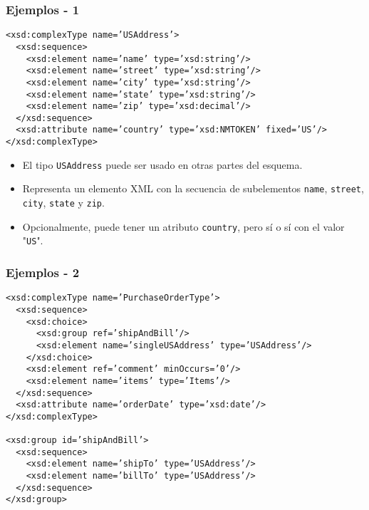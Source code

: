 \begin{frame}
\frametitle{Ejemplos - 1}
\footnotesize
\texttt{<xsd:complexType name='USAddress'>				\\
	~~<xsd:sequence>						\\
	~~~~<xsd:element name='name'   type='xsd:string'/>		\\
	~~~~<xsd:element name='street' type='xsd:string'/>		\\
	~~~~<xsd:element name='city'   type='xsd:string'/>		\\
	~~~~<xsd:element name='state'  type='xsd:string'/>		\\
	~~~~<xsd:element name='zip'    type='xsd:decimal'/>		\\
	~~</xsd:sequence>						\\
	~~<xsd:attribute name='country' type='xsd:NMTOKEN' fixed='US'/>	\\
	</xsd:complexType>
}

\pause

\begin{itemize}
\item	El tipo \texttt{USAddress} puede ser usado en otras partes del
	esquema.
	\pause

\item	Representa un elemento XML con la secuencia de subelementos
	\texttt{name}, \texttt{street}, \texttt{city}, \texttt{state} y
	\texttt{zip}.
	\pause

\item	Opcionalmente, puede tener un atributo \texttt{country}, pero sí o sí
	con el valor "\texttt{US}".
\end{itemize}

\end{frame}

\begin{frame}
\frametitle{Ejemplos - 2}
\footnotesize
\texttt{<xsd:complexType name='PurchaseOrderType'>			\\
	~~<xsd:sequence>						\\
	~~~~<xsd:choice>						\\
	~~~~~~<xsd:group   ref='shipAndBill'/>				\\
	~~~~~~<xsd:element name='singleUSAddress' type='USAddress'/>	\\
	~~~~</xsd:choice>						\\
	~~~~<xsd:element ref='comment' minOccurs='0'/>			\\
	~~~~<xsd:element name='items'  type='Items'/>			\\
	~~</xsd:sequence>						\\
	~~<xsd:attribute name='orderDate' type='xsd:date'/>		\\
	</xsd:complexType>						\\
	~								\\
	<xsd:group id='shipAndBill'>					\\
	~~<xsd:sequence>						\\
	~~~~<xsd:element name='shipTo' type='USAddress'/>		\\
	~~~~<xsd:element name='billTo' type='USAddress'/>		\\
	~~</xsd:sequence>						\\
	</xsd:group>
}
\end{frame}

